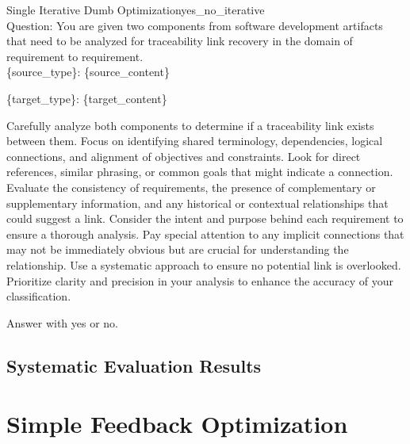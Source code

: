 \begin{prompt}{\KISS Single Iterative Dumb Optimization}{yes_no_iterative}\\
    Question: You are given two components from software development artifacts that need to be analyzed for traceability link recovery in the domain of requirement to requirement.\\
    
    \{source\_type\}: \tripplequote\{source\_content\}\tripplequote

    \{target\_type\}: \tripplequote\{target\_content\}\tripplequote

    Carefully analyze both components to determine if a traceability link exists between them. Focus on identifying shared terminology, dependencies, logical connections, and alignment of objectives and constraints. Look for direct references, similar phrasing, or common goals that might indicate a connection. Evaluate the consistency of requirements, the presence of complementary or supplementary information, and any historical or contextual relationships that could suggest a link. Consider the intent and purpose behind each requirement to ensure a thorough analysis. Pay special attention to any implicit connections that may not be immediately obvious but are crucial for understanding the relationship. Use a systematic approach to ensure no potential link is overlooked. Prioritize clarity and precision in your analysis to enhance the accuracy of your classification.

    Answer with \textquotesingle{}yes\textquotesingle{} or \textquotesingle{}no\textquotesingle{}.
    
\end{prompt}

\subsection{Systematic Evaluation Results}

\begin{table}
    \centering
    \renewcommand{\arraystretch}{1.4}
    
    \renewcommand{\arraystretch}{1}
    \caption{Naive prompt optimization approach prompting the model to optimize the classification prompt}
    \label{tab:naive_optimization}
\end{table}

\newpage
\section{Simple Feedback Optimization}

